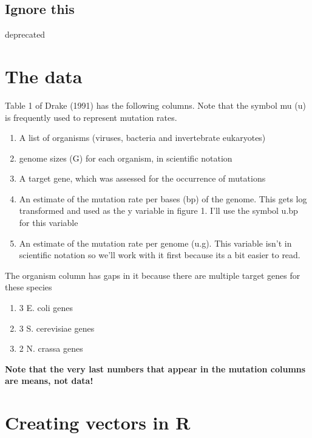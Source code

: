 \documentclass[
]{book}
\providecommand{\tightlist}{%
  \setlength{\itemsep}{0pt}\setlength{\parskip}{0pt}}
\begin{document}
\hypertarget{ignore-this}{%
\subsection{Ignore this}\label{ignore-this}}

deprecated

\hypertarget{the-data}{%
\section{The data}\label{the-data}}

Table 1 of Drake (1991) has the following columns. Note that the symbol mu (u) is frequently used to represent mutation rates.

\begin{enumerate}
\def\labelenumi{\arabic{enumi}.}
\tightlist
\item
  A list of organisms (viruses, bacteria and invertebrate eukaryotes)
\item
  genome sizes (G) for each organism, in scientific notation
\item
  A target gene, which was assessed for the occurrence of mutations
\item
  An estimate of the mutation rate per bases (bp) of the genome. This gets log transformed and used as the y variable in figure 1. I'll use the symbol u.bp for this variable
\item
  An estimate of the mutation rate per genome (u.g). This variable isn't in scientific notation so we'll work with it first because its a bit easier to read.
\end{enumerate}

The organism column has gaps in it because there are multiple target genes for these species

\begin{enumerate}
\def\labelenumi{\arabic{enumi}.}
\tightlist
\item
  3 E. coli genes
\item
  3 S. cerevisiae genes
\item
  2 N. crassa genes
\end{enumerate}

\textbf{Note that the very last numbers that appear in the mutation columns are means, not data!}

\hypertarget{creating-vectors-in-r}{%
\section{Creating vectors in R}\label{creating-vectors-in-r}}
\end{document}
